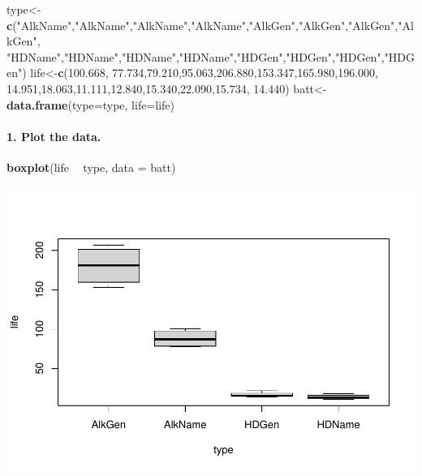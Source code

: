 \documentclass[
]{article}
\newenvironment{Shaded}{\begin{snugshade}}{\end{snugshade}}
\newcommand{\DataTypeTok}[1]{\textcolor[rgb]{0.13,0.29,0.53}{#1}}
\newcommand{\FloatTok}[1]{\textcolor[rgb]{0.00,0.00,0.81}{#1}}
\newcommand{\KeywordTok}[1]{\textcolor[rgb]{0.13,0.29,0.53}{\textbf{#1}}}
\newcommand{\NormalTok}[1]{#1}
\newcommand{\OperatorTok}[1]{\textcolor[rgb]{0.81,0.36,0.00}{\textbf{#1}}}
\newcommand{\StringTok}[1]{\textcolor[rgb]{0.31,0.60,0.02}{#1}}
\begin{document}
\begin{Shaded}
\begin{Highlighting}[]
\NormalTok{type<-}\KeywordTok{c}\NormalTok{(}\StringTok{"AlkName"}\NormalTok{,}\StringTok{"AlkName"}\NormalTok{,}\StringTok{"AlkName"}\NormalTok{,}\StringTok{"AlkName"}\NormalTok{,}\StringTok{"AlkGen"}\NormalTok{,}\StringTok{"AlkGen"}\NormalTok{,}\StringTok{"AlkGen"}\NormalTok{,}\StringTok{"AlkGen"}\NormalTok{,}
\StringTok{"HDName"}\NormalTok{,}\StringTok{"HDName"}\NormalTok{,}\StringTok{"HDName"}\NormalTok{,}\StringTok{"HDName"}\NormalTok{,}\StringTok{"HDGen"}\NormalTok{,}\StringTok{"HDGen"}\NormalTok{,}\StringTok{"HDGen"}\NormalTok{,}\StringTok{"HDGen"}\NormalTok{)}
\NormalTok{life<-}\KeywordTok{c}\NormalTok{(}\FloatTok{100.668}\NormalTok{, }\FloatTok{77.734}\NormalTok{,}\FloatTok{79.210}\NormalTok{,}\FloatTok{95.063}\NormalTok{,}\FloatTok{206.880}\NormalTok{,}\FloatTok{153.347}\NormalTok{,}\FloatTok{165.980}\NormalTok{,}\FloatTok{196.000}\NormalTok{,}
\FloatTok{14.951}\NormalTok{,}\FloatTok{18.063}\NormalTok{,}\FloatTok{11.111}\NormalTok{,}\FloatTok{12.840}\NormalTok{,}\FloatTok{15.340}\NormalTok{,}\FloatTok{22.090}\NormalTok{,}\FloatTok{15.734}\NormalTok{, }\FloatTok{14.440}\NormalTok{)}
\NormalTok{batt<-}\KeywordTok{data.frame}\NormalTok{(}\DataTypeTok{type=}\NormalTok{type, }\DataTypeTok{life=}\NormalTok{life)}
\end{Highlighting}
\end{Shaded}

\hypertarget{plot-the-data.}{%
\paragraph{1. Plot the data.}\label{plot-the-data.}}

\begin{Shaded}
\begin{Highlighting}[]
\KeywordTok{boxplot}\NormalTok{(life }\OperatorTok{~}\StringTok{ }\NormalTok{type, }\DataTypeTok{data =}\NormalTok{ batt)}
\end{Highlighting}
\end{Shaded}

\includegraphics{HW7_XiangyuRen_files/figure-latex/unnamed-chunk-2-1.pdf}
\end{document}

